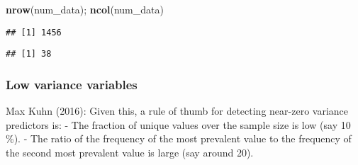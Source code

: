 \documentclass[]{article}
\newenvironment{Shaded}{\begin{snugshade}}{\end{snugshade}}
\newcommand{\KeywordTok}[1]{\textcolor[rgb]{0.13,0.29,0.53}{\textbf{#1}}}
\newcommand{\NormalTok}[1]{#1}
\begin{document}
\begin{Shaded}
\begin{Highlighting}[]
\KeywordTok{nrow}\NormalTok{(num_data); }\KeywordTok{ncol}\NormalTok{(num_data)}
\end{Highlighting}
\end{Shaded}

\begin{verbatim}
## [1] 1456
\end{verbatim}

\begin{verbatim}
## [1] 38
\end{verbatim}

\hypertarget{low-variance-variables}{%
\subsubsection{Low variance variables}\label{low-variance-variables}}

Max Kuhn (2016): Given this, a rule of thumb for detecting near-zero
variance predictors is: - The fraction of unique values over the sample
size is low (say 10 \%). - The ratio of the frequency of the most
prevalent value to the frequency of the second most prevalent value is
large (say around 20).
\end{document}
